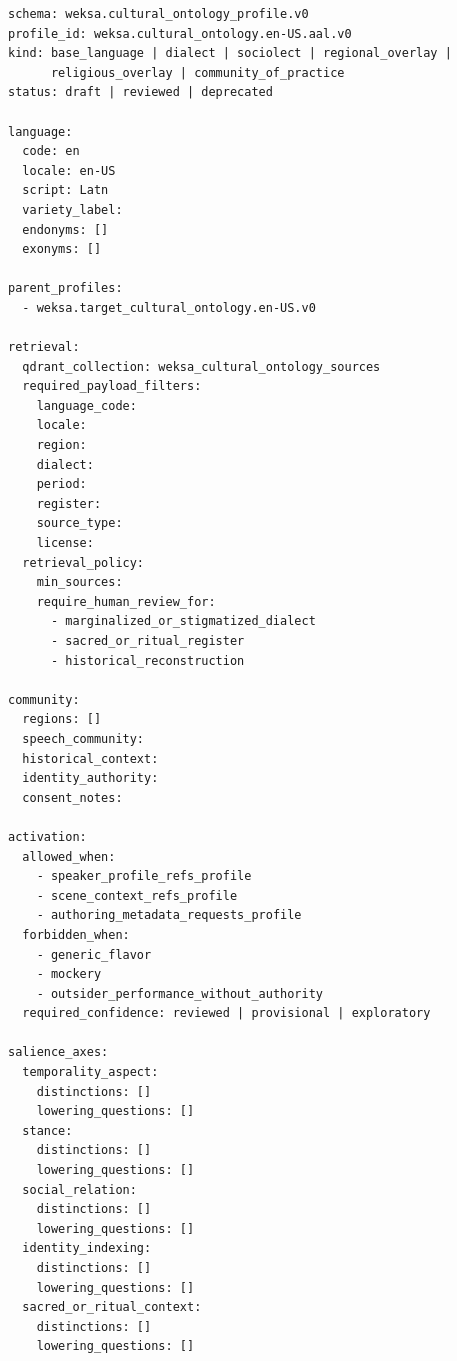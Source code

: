 \documentclass[11pt]{article}
\begin{document}
\begin{lstlisting}[basicstyle=\ttfamily\small,breaklines=true]
schema: weksa.cultural_ontology_profile.v0
profile_id: weksa.cultural_ontology.en-US.aal.v0
kind: base_language | dialect | sociolect | regional_overlay |
      religious_overlay | community_of_practice
status: draft | reviewed | deprecated

language:
  code: en
  locale: en-US
  script: Latn
  variety_label:
  endonyms: []
  exonyms: []

parent_profiles:
  - weksa.target_cultural_ontology.en-US.v0

retrieval:
  qdrant_collection: weksa_cultural_ontology_sources
  required_payload_filters:
    language_code:
    locale:
    region:
    dialect:
    period:
    register:
    source_type:
    license:
  retrieval_policy:
    min_sources:
    require_human_review_for:
      - marginalized_or_stigmatized_dialect
      - sacred_or_ritual_register
      - historical_reconstruction

community:
  regions: []
  speech_community:
  historical_context:
  identity_authority:
  consent_notes:

activation:
  allowed_when:
    - speaker_profile_refs_profile
    - scene_context_refs_profile
    - authoring_metadata_requests_profile
  forbidden_when:
    - generic_flavor
    - mockery
    - outsider_performance_without_authority
  required_confidence: reviewed | provisional | exploratory

salience_axes:
  temporality_aspect:
    distinctions: []
    lowering_questions: []
  stance:
    distinctions: []
    lowering_questions: []
  social_relation:
    distinctions: []
    lowering_questions: []
  identity_indexing:
    distinctions: []
    lowering_questions: []
  sacred_or_ritual_context:
    distinctions: []
    lowering_questions: []


\end{lstlisting}
\end{document}

